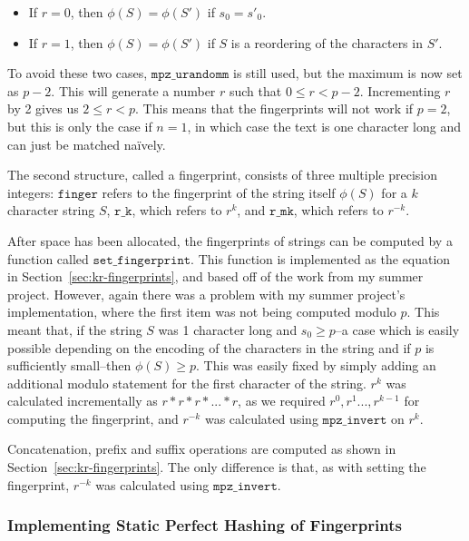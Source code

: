 \documentclass[ %
                    author={Dominic Joseph Moylett},
                    degree={MEng},
                     title={Dictionary Matching with Fingerprints},
                  subtitle={An Empirical Analysis},
                      type={Research},
                      year={2014} ]{dissertation}
\begin{document}
\begin{itemize}
  \item If $r = 0$, then $\phi(S) = \phi(S')$ if $s_0 = s'_0$.
  \item If $r = 1$, then $\phi(S) = \phi(S')$ if $S$ is a reordering of the characters in $S'$.
\end{itemize}

To avoid these two cases, $\texttt{mpz\_urandomm}$ is still used, but the maximum is now set as $p-2$. This will generate a number $r$ such that $0 \leq r < p-2$. Incrementing $r$ by 2 gives us $2 \leq r < p$. This means that the fingerprints will not work if $p = 2$, but this is only the case if $n = 1$, in which case the text is one character long and can just be matched na\"{i}vely.

The second structure, called a fingerprint, consists of three multiple precision integers: $\texttt{finger}$ refers to the fingerprint of the string itself $\phi(S)$ for a $k$ character string $S$, $\texttt{r\_k}$, which refers to $r^k$, and $\texttt{r\_mk}$, which refers to $r^{-k}$.

After space has been allocated, the fingerprints of strings can be computed by a function called $\texttt{set\_fingerprint}$. This function is implemented as the equation in Section~\ref{sec:kr-fingerprints}, and based off of the work from my summer project. However, again there was a problem with my summer project's implementation, where the first item was not being computed modulo $p$. This meant that, if the string $S$ was 1 character long and $s_0 \geq p$--a case which is easily possible depending on the encoding of the characters in the string and if $p$ is sufficiently small--then $\phi(S) \geq p$. This was easily fixed by simply adding an additional modulo statement for the first character of the string. $r^k$ was calculated incrementally as $r*r*r*...*r$, as we required $r^0,r^1...,r^{k-1}$ for computing the fingerprint, and $r^{-k}$ was calculated using $\texttt{mpz\_invert}$ on $r^k$.

Concatenation, prefix and suffix operations are computed as shown in Section~\ref{sec:kr-fingerprints}. The only difference is that, as with setting the fingerprint, $r^{-k}$ was calculated using $\texttt{mpz\_invert}$.

\subsubsection{Implementing Static Perfect Hashing of Fingerprints}
\label{sssec:static-hashing-kr}
\end{document}
